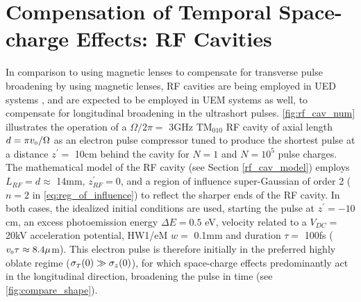
\section{Compensation of Temporal Space-charge Effects: RF Cavities} \label{sec:rf_cav_charge}

In comparison to using magnetic lenses to compensate for transverse pulse broadening by using magnetic lenses, RF cavities are being employed in UED systems \cite{oudheusden_electron_2007}, and are expected to be employed in UEM systems as well, to compensate for longitudinal broadening in the ultrashort pulses.
\ref{fig:rf_cav_num} illustrates the operation of a $ \Omega / 2 \pi = $ 3GHz $\text{TM}_{010}$ RF cavity of axial length $ d = \pi v_{{\scriptscriptstyle 0}} / \Omega $ as an electron pulse compressor tuned to produce the shortest pulse at a distance $ z^{\prime} = $ 10cm behind the cavity for $N=1$ and $N=10^5$ pulse charges.
The mathematical model of the RF cavity (see Section \ref{rf_cav_model}) employs $L_{RF} = d \approx $ 14mm, $ z^{\prime}_{RF} = 0 $, and a region of influence super-Gaussian of order 2 ($n=2$ in \ref{eq:reg_of_influence}) to reflect the sharper ends of the RF cavity.
In both cases, the idealized initial conditions are used, starting the pulse at $ z^{\prime} = -10$ cm, an excess photoemission energy $\Delta E = 0.5$ eV, velocity related to a $V_{DC} = $ 20kV acceleration potential, HW1/eM $ w = $ 0.1mm and duration $\tau = $ 100fs ($v_{{\scriptscriptstyle 0}} \tau \approx 8.4 \mu$m).
This electron pulse is therefore initially in the preferred highly oblate regime ($ \sigma_{{\scriptscriptstyle T}}(0) \gg \sigma_{z} (0) $), for which space-charge effects predominantly act in the longitudinal direction, broadening the pulse in time (see \ref{fig:compare_shape}).



